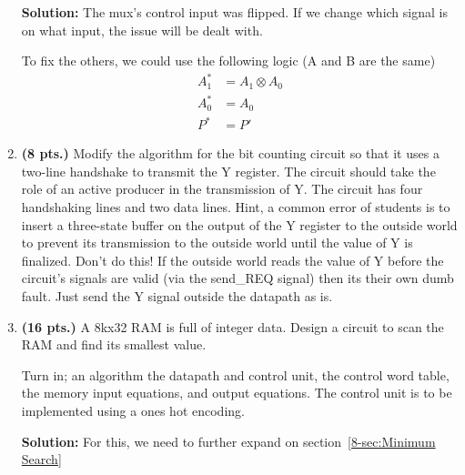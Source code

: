 \begin{enumerate}
        \begin{onlysolution} \textbf{Solution: }
            The mux's control input was flipped. If we change which signal is on what input, the issue will be dealt with.

            To fix the others, we could use the following logic (A and B are the same)
            \begin{align*}
                A_1^* & = A_1 \otimes A_0 \\
                A_0^* & = A_0             \\
                P^*   & = P'
            \end{align*}
        \end{onlysolution}
    \item \textbf{ (8 pts.)}
        Modify the algorithm for the bit counting circuit so that it uses a
        two-line handshake to transmit the Y register.  The circuit should take
        the role of an active producer in the transmission of Y.  The circuit
        has four handshaking lines and two data lines.  Hint, a common
        error of students is to insert a three-state buffer on the output of
        the Y register to the outside world to prevent its transmission to
        the outside world until the value of Y is finalized.  Don't do this!
        If the outside world reads the value of Y before the circuit's signals
        are valid (via the send\_REQ signal) then its their own dumb fault.
        Just send the Y signal outside the datapath as is.

    \item \textbf{ (16 pts.)}
        A 8kx32 RAM is full of integer data.  Design a circuit to scan
        the RAM and find its smallest value.

        Turn in; an algorithm the datapath and control unit, the control word
        table, the memory input equations, and output equations.
        The control unit is to be implemented using a ones hot encoding.

        \begin{onlysolution}[fragile] \textbf{Solution: }
            For this, we need to further expand on section~\ref{8-sec:Minimum Search}


\end{onlysolution}
\end{enumerate}
